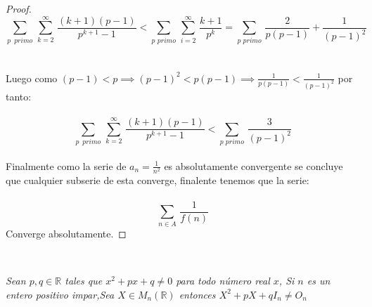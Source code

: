 \documentclass[11pt,letterpaper]{article}
\newcommand{\R}{\mathbb{R}}
\begin{document}
\begin{proof}
\begin{equation*}
    \sum_{p\,\,\,primo}\,\sum_{k=2}^{\infty}\,\frac{(k+1)(p-1)}{p^{k+1}-1}<\sum_{p\,\,primo}\,\sum_{i=2}^{\infty}\,\frac{k+1}{p^k}=\sum_{p\,\,primo}\,\frac{2}{p(p-1)}+\frac{1}{(p-1)^2}
\end{equation*}\,\\
\,\\
Luego como $(p-1)<p\implies(p-1)^2<p(p-1)\implies\frac{1}{p(p-1)}<\frac{1}{(p-1)^2}$ por tanto:\,\\
\,\\
\begin{equation*}
    \sum_{p\,\,\,primo}\,\sum_{k=2}^{\infty}\,\frac{(k+1)(p-1)}{p^{k+1}-1}<\sum_{p\,\,primo}\,\frac{3}{(p-1)^2}
\end{equation*}\,\\
Finalmente como la serie de $a_n=\frac{1}{n^2}$ es absolutamente convergente se concluye que cualquier subserie de esta converge, finalente tenemos que la serie:\,\\
\,\\
\begin{equation*}
    \sum_{n\in A}\,\frac{1}{f(n)}
\end{equation*}
Converge absolutamente.
\end{proof}\,\\
\begin{tcolorbox}[
	title = \textcolor{black}{\textcolor{white}{Problema 3}},]
\textit{Sean $p,q\in \R$ tales que $x^2+px+q\neq 0$ para todo n\'umero real $x$, Si $n$ es un entero positivo impar,Sea
$X\in M_n(\R)$ entonces $X^2+pX+qI_n\neq O_n$
}
\end{tcolorbox}
\end{document}
